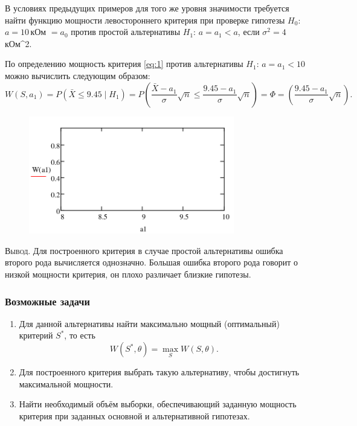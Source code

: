 \begin{ex}
	В условиях предыдущих примеров для того же уровня значимости требуется найти
	функцию мощности левостороннего критерия при проверке гипотезы $ H_0 $: $ a =
	10$\,кОм $ = a_0 $ против простой альтернативы $ H_1 $: $ a = a_1 < a $, если
	$ \sigma^2 = 4 $\,кОм^2.
\begin{solution}
	По определению мощность критерия \eqref{eq:1} против альтернативы $ H_1 $: $ a
	= a_1 < 10$ можно вычислить следующим образом: 
	\[
			W(S, a_1) = P(\bar X \leqslant 9.45\mid H_1) = P \left( \frac{\bar X -
			a_1}{\sigma} \sqrt n \leqslant \frac{9.45 - a_1}{\sigma} \sqrt n \right) =
			\Phi = \left( \frac{9.45 - a_1}{\sigma}\sqrt n \right).
	\]
	\begin{figure}[h!]
		\centering
		\includegraphics[width=0.8\textwidth]{Figures/9-plot2.png}
		\caption{}
		\label{fig:9-plot2}
	\end{figure}

\end{solution}
\end{ex}

\textsc{Вывод}.
Для построенного критерия в случае простой альтернативы ошибка второго рода 
вычисляется однозначно. 
 Большая ошибка второго рода говорит о низкой мощности критерия, он плохо различает 
близкие гипотезы. 

\subsubsection{Возможные задачи}
\begin{enumerate}
	\item Для данной альтернативы найти максимально мощный (оптимальный) критерий
		$ S^\ast $, то есть  
		\[
				W(S^\ast, \theta) = \max_S W(S,\theta).
		\]
	\item Для построенного критерия выбрать такую альтернативу, чтобы достигнуть
		максимальной мощности.
	\item Найти необходимый объём выборки, обеспечивающий заданную мощность
		критерия при заданных основной и альтернативной гипотезах.
\end{enumerate}


